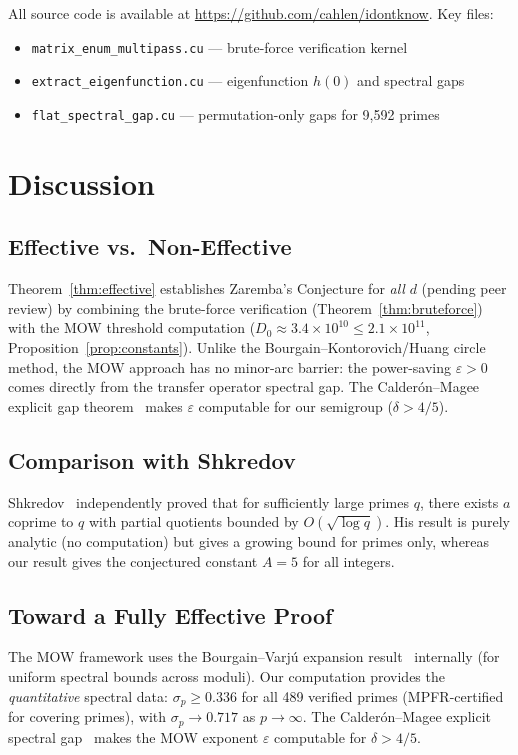 \documentclass[11pt,a4paper]{amsart}
\theoremstyle{definition}
\begin{document}
All source code is available at \url{https://github.com/cahlen/idontknow}. Key files:
\begin{itemize}
\item \texttt{matrix\_enum\_multipass.cu} — brute-force verification kernel
\item \texttt{extract\_eigenfunction.cu} — eigenfunction $h(0)$ and spectral gaps
\item \texttt{flat\_spectral\_gap.cu} — permutation-only gaps for 9{,}592 primes
\end{itemize}

\section{Discussion}

\subsection{Effective vs.\ Non-Effective}

Theorem~\ref{thm:effective} establishes Zaremba's Conjecture for \emph{all} $d$ (pending peer review) by combining the brute-force verification (Theorem~\ref{thm:bruteforce}) with the MOW threshold computation ($D_0 \approx 3.4 \times 10^{10} \leq 2.1 \times 10^{11}$, Proposition~\ref{prop:constants}). Unlike the Bourgain--Kontorovich/Huang circle method, the MOW approach has no minor-arc barrier: the power-saving $\varepsilon > 0$ comes directly from the transfer operator spectral gap. The Calder\'on--Magee explicit gap theorem~\cite{CM2025} makes $\varepsilon$ computable for our semigroup ($\delta > 4/5$).

\subsection{Comparison with Shkredov}

Shkredov~\cite{Shkredov2026} independently proved that for sufficiently large primes $q$, there exists $a$ coprime to $q$ with partial quotients bounded by $O(\sqrt{\log q})$. His result is purely analytic (no computation) but gives a growing bound for primes only, whereas our result gives the conjectured constant $A=5$ for all integers.

\subsection{Toward a Fully Effective Proof}

The MOW framework uses the Bourgain--Varj\'u expansion result~\cite{BG2008} internally (for uniform spectral bounds across moduli). Our computation provides the \emph{quantitative} spectral data: $\sigma_p \geq 0.336$ for all 489 verified primes (MPFR-certified for covering primes), with $\sigma_p \to 0.717$ as $p \to \infty$. The Calder\'on--Magee explicit spectral gap~\cite{CM2025} makes the MOW exponent $\varepsilon$ computable for $\delta > 4/5$.
\end{document}
